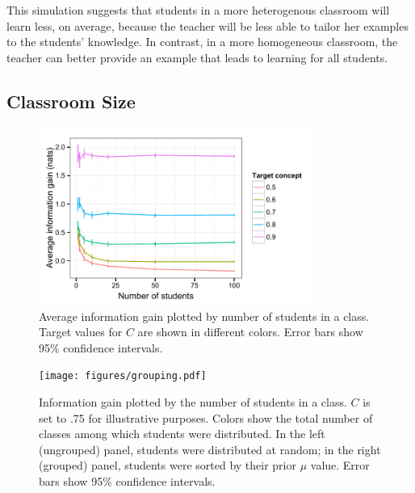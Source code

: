 \documentclass[10pt,letterpaper]{article}
\begin{document}
This simulation suggests that students in a more heterogenous classroom will learn less, on average, because the teacher will be less able to tailor her examples to the students' knowledge. In contrast, in a more homogeneous classroom, the teacher can better provide an example that leads to learning for all students. 

\subsection{Classroom Size}

\begin{figure}
\begin{center}
\includegraphics[width=3.5in]{figures/class_size.pdf}
\end{center}
\vspace{-2ex}
\caption{\label{fig:class} Average information gain plotted by number of students in a class. Target values for $C$ are shown in different colors. Error bars show 95\% confidence intervals.}
\vspace{-2ex}
\end{figure}



\begin{figure}
\begin{center}
\texttt{[image: figures/grouping.pdf]}
\end{center}
\vspace{-2ex}
\caption{\label{fig:grouping} Information gain plotted by the number of students in a class. $C$ is set to .75 for illustrative purposes. Colors show the total number of classes among which students were distributed. In the left (ungrouped) panel, students were distributed at random; in the right (grouped) panel, students were sorted by their prior $\mu$ value. Error bars show 95\% confidence intervals.}
\vspace{-2ex}
\end{figure}
\end{document}
